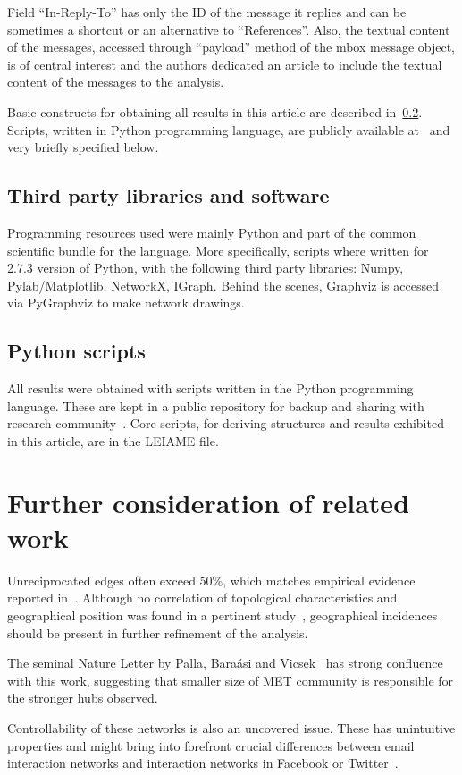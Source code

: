 \documentclass[%
 aip,
 jmp,%
 amsmath,amssymb,
 reprint,%
]{revtex4-1}
\begin{document}
Field ``In-Reply-To'' has only the ID of the message it replies and can be sometimes
a shortcut or an alternative to ``References''. Also, the textual content of the messages,
accessed through ``payload'' method of the mbox message object, is of central interest and
the authors dedicated an article to include the textual content of the messages to the analysis.

Basic constructs for obtaining all results in this article are described in~\ref{ap:os}. Scripts, written in Python programming language, are publicly available at~\cite{scriptsFim} and very briefly specified below.

\subsection{Third party libraries and software}
Programming resources used were mainly Python and part of the
common scientific bundle for the language. More specifically,
scripts where written for 2.7.3 version of Python,
with the following third party libraries: Numpy, Pylab/Matplotlib, NetworkX, IGraph.
Behind the scenes, Graphviz is accessed via PyGraphviz to make network drawings.

\subsection{Python scripts}\label{ap:os}
All results were obtained with scripts written in the Python programming language. These are kept in a public repository for backup and sharing with research community~\cite{scriptsFim}. Core scripts, for deriving structures and results exhibited in this article, are in the LEIAME file.
\section{Further consideration of related work}\label{sec:fure}
Unreciprocated edges often exceed 50\%, which matches empirical evidence reported in~\cite{newmanEvolving}. Although no correlation of topological characteristics and geographical position was found in a pertinent study~\cite{barabasiGeo}, geographical incidences should be present in further refinement of the analysis.

The seminal Nature Letter by Palla, Bara{\'a}si and Vicsek~\cite{barabasiEvo} has strong confluence with this work, suggesting that smaller size of MET community is responsible for the stronger hubs observed.

Controllability of these networks is also an uncovered issue. These has unintuitive properties and might bring into forefront crucial differences between email interaction networks and interaction networks in Facebook or Twitter~\cite{barabasiControlCapacity,barabasiControlCentrality,barabasiControllability}.
\end{document}
